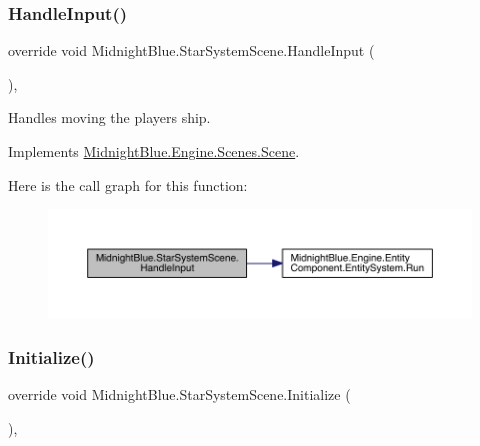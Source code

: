 \subsubsection{\texorpdfstring{Handle\+Input()}{HandleInput()}}
{\footnotesize\ttfamily override void Midnight\+Blue.\+Star\+System\+Scene.\+Handle\+Input (\begin{DoxyParamCaption}{ }\end{DoxyParamCaption})\hspace{0.3cm}{\ttfamily [inline]}, {\ttfamily [virtual]}}



Handles moving the players ship. 



Implements \hyperlink{class_midnight_blue_1_1_engine_1_1_scenes_1_1_scene_a2f7849ef8976f9aeed0023448033b6fd}{Midnight\+Blue.\+Engine.\+Scenes.\+Scene}.

Here is the call graph for this function\+:
\nopagebreak
\begin{figure}[H]
\begin{center}
\leavevmode
\includegraphics[width=350pt]{class_midnight_blue_1_1_star_system_scene_a9fd64901322082a4da8658650257163d_cgraph}
\end{center}
\end{figure}
\hypertarget{class_midnight_blue_1_1_star_system_scene_a1b593cd45d0f1b6c02f17ec5dd1033ca}{}\label{class_midnight_blue_1_1_star_system_scene_a1b593cd45d0f1b6c02f17ec5dd1033ca} 
\subsubsection{\texorpdfstring{Initialize()}{Initialize()}}
{\footnotesize\ttfamily override void Midnight\+Blue.\+Star\+System\+Scene.\+Initialize (\begin{DoxyParamCaption}{ }\end{DoxyParamCaption})\hspace{0.3cm}{\ttfamily [inline]}, {\ttfamily [virtual]}}




